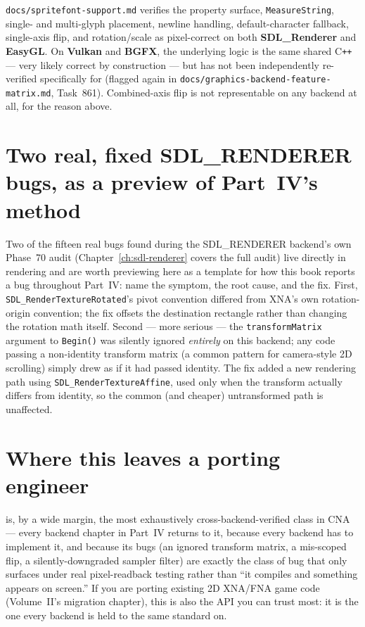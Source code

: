 \texttt{docs/spritefont-support.md} verifies the property surface, \texttt{MeasureString},
single- and multi-glyph placement, newline handling, default-character fallback, single-axis
flip, and rotation/scale as pixel-correct on both \textbf{SDL\_Renderer} and \textbf{EasyGL}.
On \textbf{Vulkan} and \textbf{BGFX}, the underlying logic is the same shared C\texttt{++} ---
very likely correct by construction --- but has not been independently re-verified
specifically for  (flagged again in
\texttt{docs/graphics-backend-feature-matrix.md}, Task~861). Combined-axis flip is not
representable on any backend at all, for the  reason above.

\section{Two real, fixed SDL\_RENDERER bugs, as a preview of Part~IV's method}

Two of the fifteen real bugs found during the SDL\_RENDERER backend's own Phase~70 audit
(Chapter~\ref{ch:sdl-renderer} covers the full audit) live directly in 
rendering and are worth previewing here as a template for how this book reports a bug
throughout Part~IV: name the symptom, the root cause, and the fix. First,
\texttt{SDL\_RenderTextureRotated}'s pivot convention differed from XNA's own rotation-origin
convention; the fix offsets the destination rectangle rather than changing the rotation math
itself. Second --- more serious --- the \texttt{transformMatrix} argument to
\texttt{Begin()} was silently ignored \emph{entirely} on this backend; any code passing a
non-identity transform matrix (a common pattern for camera-style 2D scrolling) simply drew as
if it had passed identity. The fix added a new rendering path using
\texttt{SDL\_RenderTextureAffine}, used only when the transform actually differs from
identity, so the common (and cheaper) untransformed path is unaffected.

\section{Where this leaves a porting engineer}

 is, by a wide margin, the most exhaustively cross-backend-verified
class in CNA --- every backend chapter in Part~IV returns to it, because every backend has
to implement it, and because its bugs (an ignored transform matrix, a mis-scoped flip, a
silently-downgraded sampler filter) are exactly the class of bug that only surfaces under
real pixel-readback testing rather than ``it compiles and something appears on screen.'' If
you are porting existing 2D XNA/FNA game code (Volume~II's migration chapter), this is also
the API you can trust most: it is the one every backend is held to the same standard on.
